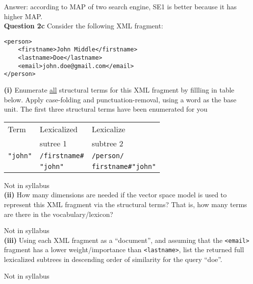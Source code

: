 \documentclass[11pt,a4paper]{report}
\begin{document}
\begin{multicols*}{2}
\noindent Answer: according to MAP of two search engine, SE1 is better because it has higher MAP. \\

\noindent \textbf{Question 2c} Consider the following XML fragment:

\begin{verbatim}
<person>
    <firstname>John Middle</firstname>
    <lastname>Doe</lastname>
    <email>john.doe@gmail.com</email>
</person>
\end{verbatim}

\noindent \textbf{(i)} Enumerate \underline{all} structural terms for this XML fragment by fillling in table below. Apply case-folding and punctuation-removal, using a word as the base unit. The first three structural terms have been enumerated for you

\begin{center}
\begin{tabular}{| l | l | l |}
    \hline
    Term & Lexicalized & Lexicalize \\
         & sutree 1    & subtree 2  \\
    \hline
    \verb|"john"| & \verb|/firstname#| & \verb|/person/|\\
                  & \verb|"john"|      & \verb|firstname#"john"| \\
    \hline
\end{tabular}
\end{center}

\noindent Not in syllabus\\

\noindent \textbf{(ii)} How many dimensions are needed if the vector space model is used to represent this XML fragment via the structural terms? That is, how many terms are there in the vocabulary/lexicon?

\noindent Not in syllabus\\

\noindent \textbf{(iii)} Using each XML fragment as a ``document'', and assuming that the \verb|<email>| fragment has a lower weight/importance than \verb|<lastname>|, list the returned full lexicalized subtrees in descending order of similarity for the query ``doe''.

\noindent Not in syllabus

\end{multicols*}
\end{document}
